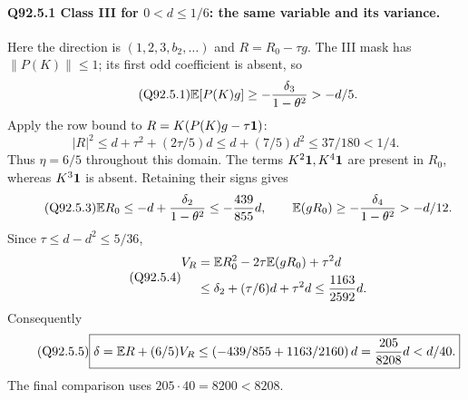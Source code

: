 \paragraph{Q92.5.1 Class III for \(0<\allowbreak d\le\allowbreak 1/6\): the same variable and its variance.}
Here the direction is \((1,\allowbreak 2,\allowbreak 3,\allowbreak b_2,\allowbreak \ldots)\) and \(R=\allowbreak R_0-\tau g\).
The III mask has \(\|P(K)\|\le\allowbreak 1\); its first odd coefficient is absent, so
\begin{equation}\tag{Q92.5.1}\label{eq:Q92:5.1}
\mathbb E[P(K)g]\ge-\frac{\delta_3}{1-\theta^2}>-d/5.
\end{equation}
Apply the row bound to \(R=\allowbreak K(P(K)g-\tau\mathbf1)\):
\begin{equation}\tag{Q92.5.2}\label{eq:Q92:5.2}
|R|^2\le d+\tau^2+(2\tau/5)d
\le d+(7/5)d^2\le37/180<1/4.
\end{equation}
Thus \(\eta=\allowbreak 6/5\) throughout this domain.
The terms \(K^2\mathbf1,\allowbreak K^4\mathbf1\) are present in \(R_0\), whereas
\(K^3\mathbf1\) is absent. Retaining their signs gives
\begin{equation}\tag{Q92.5.3}\label{eq:Q92:5.3}
\mathbb E R_0\le-d+\frac{\delta_2}{1-\theta^2}\le-\frac{439}{855}d,
\qquad\mathbb E(gR_0)\ge-\frac{\delta_4}{1-\theta^2}>-d/12.
\end{equation}
Since \(\tau\le\allowbreak  d-d^2\le\allowbreak 5/36\),
\begin{equation}\tag{Q92.5.4}\label{eq:Q92:5.4}
\begin{aligned}
V_R&=\mathbb E R_0^2-2\tau\mathbb E(gR_0)+\tau^2d\\
&\le\delta_2+(\tau/6)d+\tau^2d\le\frac{1163}{2592}d.
\end{aligned}
\end{equation}
Consequently
\begin{equation}\tag{Q92.5.5}\label{eq:Q92:5.5}
\boxed{\delta=\mathbb E R+(6/5)V_R
\le\left(-439/855+1163/2160\right)d
=\frac{205}{8208}d<d/40.}
\end{equation}
The final comparison uses \(205\cdot40=\allowbreak 8200<\allowbreak 8208\).

